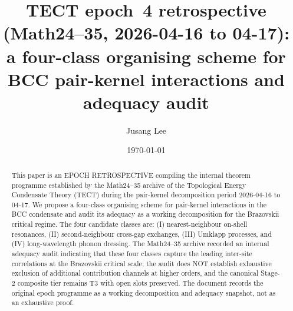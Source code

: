 



\title{TECT epoch~4 retrospective (Math24--35, 2026-04-16 to 04-17):
a four-class organising scheme for BCC pair-kernel interactions
and adequacy audit}

\author{Jusang Lee}

\date{\today}

\begin{abstract}
This paper is an EPOCH RETROSPECTIVE compiling the internal theorem
programme established by the Math24--35 archive of the Topological
Energy Condensate Theory (TECT) during the pair-kernel decomposition
period 2026-04-16 to 04-17. We propose a four-class organising scheme
for pair-kernel interactions in the BCC condensate and audit its
adequacy as a working decomposition for the Brazovskii critical
regime. The four candidate classes are: (I) nearest-neighbour
on-shell resonances, (II) second-neighbour cross-gap exchanges,
(III) Umklapp processes, and (IV) long-wavelength phonon dressing.
The Math24--35 archive recorded an internal adequacy audit indicating
that these four classes capture the leading inter-site correlations at
the Brazovskii critical scale; the audit does NOT establish exhaustive
exclusion of additional contribution channels at higher orders, and
the canonical Stage-2 composite tier remains T3 with open slots
preserved. The document records the original epoch programme as a
working decomposition and adequacy snapshot, not as an exhaustive
proof.
\cite{Math24, Math25, Math26, Math27, Math28, Math29, Math30, Math31, Math32, Math33, Math34, Math35}
\end{abstract}

